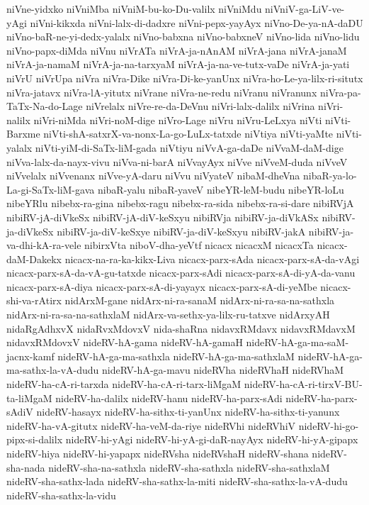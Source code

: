 {niVne-yidxko
niVniMba
niVniM-bu-ko-Du-valilx
niVniMdu
niVniV-ga-LiV-ve-yAgi
niVni-kikxda
niVni-lalx-di-dadxre
niVni-pepx-yayAyx
niVno-De-ya-nA-daDU
niVno-baR-ne-yi-dedx-yalalx
niVno-babxna
niVno-babxneV
niVno-lida
niVno-lidu
niVno-papx-diMda
niVnu
niVrATa
niVrA-ja-nAnAM
niVrA-jana
niVrA-janaM
niVrA-ja-namaM
niVrA-ja-na-tarxyaM
niVrA-ja-na-ve-tutx-vaDe
niVrA-ja-yati
niVrU
niVrUpa
niVra
niVra-Dike
niVra-Di-ke-yanUnx
niVra-ho-Le-ya-lilx-ri-situtx
niVra-jatavx
niVra-lA-yitutx
niVrane
niVra-ne-redu
niVranu
niVranunx
niVra-pa-TaTx-Na-do-Lage
niVrelalx
niVre-re-da-DeVnu
niVri-lalx-dalilx
niVrina
niVri-nalilx
niVri-niMda
niVri-noM-dige
niVro-Lage
niVru
niVru-LeLxya
niVti
niVti-Barxme
niVti-shA-satxrX-va-nonx-La-go-LuLx-tatxde
niVtiya
niVti-yaMte
niVti-yalalx
niVti-yiM-di-SaTx-liM-gada
niVtiyu
niVvA-ga-daDe
niVvaM-daM-dige
niVva-lalx-da-nayx-vivu
niVva-ni-barA
niVvayAyx
niVve
niVveM-duda
niVveV
niVvelalx
niVvenanx
niVve-yA-daru
niVvu
niVyateV
nibaM-dheVna
nibaR-ya-lo-La-gi-SaTx-liM-gava
nibaR-yalu
nibaR-yaveV
nibeYR-leM-budu
nibeYR-loLu
nibeYRlu
nibebx-ra-gina
nibebx-ragu
nibebx-ra-sida
nibebx-ra-si-dare
nibiRVjA
nibiRV-jA-diVkeSx
nibiRV-jA-diV-keSxyu
nibiRVja
nibiRV-ja-diVkASx
nibiRV-ja-diVkeSx
nibiRV-ja-diV-keSxye
nibiRV-ja-diV-keSxyu
nibiRV-jakA
nibiRV-ja-va-dhi-kA-ra-vele
nibirxVta
niboV-dha-yeVtf
nicacx
nicacxM
nicacxTa
nicacx-daM-Dakekx
nicacx-na-ra-ka-kikx-Liva
nicacx-parx-sAda
nicacx-parx-sA-da-vAgi
nicacx-parx-sA-da-vA-gu-tatxde
nicacx-parx-sAdi
nicacx-parx-sA-di-yA-da-vanu
nicacx-parx-sA-diya
nicacx-parx-sA-di-yayayx
nicacx-parx-sA-di-yeMbe
nicacx-shi-va-rAtirx
nidArxM-gane
nidArx-ni-ra-sanaM
nidArx-ni-ra-sa-na-sathxla
nidArx-ni-ra-sa-na-sathxlaM
nidArx-va-sethx-ya-lilx-ru-tatxve
nidArxyAH
nidaRgAdhxvX
nidaRvxMdovxV
nida-shaRna
nidavxRMdavx
nidavxRMdavxM
nidavxRMdovxV
nideRV-hA-gama
nideRV-hA-gamaH
nideRV-hA-ga-ma-saM-jacnx-kamf
nideRV-hA-ga-ma-sathxla
nideRV-hA-ga-ma-sathxlaM
nideRV-hA-ga-ma-sathx-la-vA-dudu
nideRV-hA-ga-mavu
nideRVha
nideRVhaH
nideRVhaM
nideRV-ha-cA-ri-tarxda
nideRV-ha-cA-ri-tarx-liMgaM
nideRV-ha-cA-ri-tirxV-BU-ta-liMgaM
nideRV-ha-dalilx
nideRV-hanu
nideRV-ha-parx-sAdi
nideRV-ha-parx-sAdiV
nideRV-hasayx
nideRV-ha-sithx-ti-yanUnx
nideRV-ha-sithx-ti-yanunx
nideRV-ha-vA-gitutx
nideRV-ha-veM-da-riye
nideRVhi
nideRVhiV
nideRV-hi-go-pipx-si-dalilx
nideRV-hi-yAgi
nideRV-hi-yA-gi-daR-nayAyx
nideRV-hi-yA-gipapx
nideRV-hiya
nideRV-hi-yapapx
nideRVsha
nideRVshaH
nideRV-shana
nideRV-sha-nada
nideRV-sha-na-sathxla
nideRV-sha-sathxla
nideRV-sha-sathxlaM
nideRV-sha-sathx-lada
nideRV-sha-sathx-la-miti
nideRV-sha-sathx-la-vA-dudu
nideRV-sha-sathx-la-vidu
}
